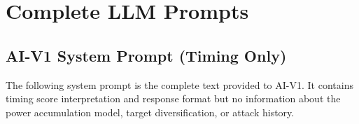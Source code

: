 \appendix


\section{Complete LLM Prompts}
\label{app:prompts}

\subsection{AI-V1 System Prompt (Timing Only)}
\label{app:v1-prompt}

The following system prompt is the complete text provided to AI-V1. It contains timing score interpretation and response format but no information about the power accumulation model, target diversification, or attack history.

